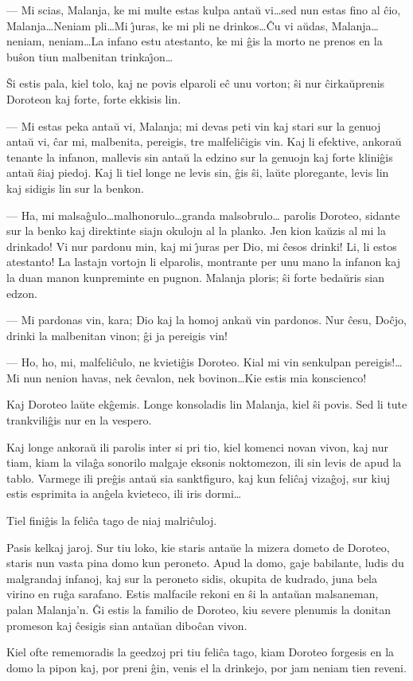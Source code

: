  --- Mi scias, Malanja, ke mi multe estas kulpa anta\u u vi\dots sed nun
estas fino al \^cio, Malanja\dots Neniam pli\dots Mi \^{\j}uras, ke
mi pli ne drinkos\dots \^Cu vi a\u udas, Malanja\dots neniam,
neniam\dots La infano estu atestanto, ke mi \^gis la morto ne prenos
en la bu\^son tiun malbenitan trinka\^{\j}on\dots

   \^Si estis pala, kiel tolo, kaj ne povis elparoli e\^c unu vorton; \^si
nur \^cir\-ka\u u\-pre\-nis Doroteon kaj forte, forte ekkisis lin.

 --- Mi estas peka anta\u u vi, Malanja; mi devas peti vin kaj stari sur
la genuoj anta\u u vi, \^car mi, malbenita, pereigis, tre
malfeli\^cigis vin. Kaj li efektive, ankora\u u tenante la infanon,
mallevis sin anta\u u la edzino sur la genuojn kaj forte klini\^gis
anta\u u \^siaj piedoj. Kaj li tiel longe ne levis sin, \^gis \^si,
la\u ute ploregante, levis lin kaj sidigis lin sur la benkon.

 --- Ha, mi malsa\^gulo\dots malhonorulo\dots granda malsobrulo\dots
 parolis Do\-ro\-te\-o, sidante sur la benko kaj direktinte siajn okulojn
al la planko. Jen kion ka\u uzis al mi la drinkado! Vi nur pardonu
min, kaj mi \^{\j}uras per Dio, mi \^cesos drinki! Li, li estos
atestanto! La lastajn vortojn li elparolis, montrante per unu mano
la infanon kaj la duan manon kunpreminte en pugnon. Malanja ploris;
\^si forte beda\u uris sian edzon.

 --- Mi pardonas vin, kara; Dio kaj la homoj anka\u u vin pardonos. Nur
\^cesu, Do\^cjo, drinki la malbenitan vinon; \^gi ja pereigis vin!

 --- Ho, ho, mi, malfeli\^culo, ne kvieti\^gis Doroteo. Kial mi vin
senkulpan pereigis!\dots Mi nun nenion havas, nek \^cevalon, nek
bovinon\dots Kie estis mia konscienco!

   Kaj Doroteo la\u ute ek\^gemis. Longe konsoladis lin Malanja, kiel \^si
povis. Sed li tute trankvili\^gis nur en la vespero.

   Kaj longe ankora\u u ili parolis inter si pri tio, kiel komenci
novan vivon, kaj nur tiam, kiam la vila\^ga sonorilo malgaje eksonis
noktomezon, ili sin levis de apud la tablo. Varmege ili pre\^gis
anta\u u sia sanktfiguro, kaj kun feli\^caj viza\^goj, sur kiuj
estis esprimita ia an\^gela kvieteco, ili iris dormi\dots

   Tiel fini\^gis la feli\^ca tago de niaj malri\^culoj.

\asterism{}

   Pasis kelkaj jaroj. Sur tiu loko, kie staris anta\u ue la mizera dometo
de Doroteo, staris nun vasta pina domo kun peroneto. Apud la domo,
gaje babilante, ludis du malgrandaj infanoj, kaj sur la peroneto
sidis, okupita de kudrado, juna bela virino en ru\^ga sarafano.
Estis malfacile rekoni en \^si la anta\u uan malsaneman, palan
Malanja'n. \^Gi estis la familio de Doroteo, kiu severe plenumis la
donitan promeson kaj \^cesigis sian anta\u uan dibo\^can vivon.

   Kiel ofte rememoradis la geedzoj pri tiu feli\^ca tago, kiam Doroteo
forgesis en la domo la pipon kaj, por preni \^gin, venis el la
drinkejo, por jam neniam tien reveni.

\smallrule{}
